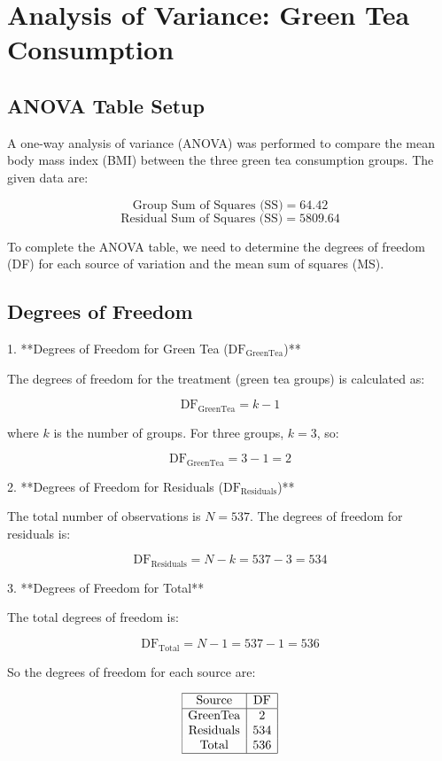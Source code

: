 \documentclass{article}
\begin{document}
\section*{Analysis of Variance: Green Tea Consumption}


\subsection*{ANOVA Table Setup}

A one-way analysis of variance (ANOVA) was performed to compare the mean body mass index (BMI) between the three green tea consumption groups. The given data are:

\[
\text{Group Sum of Squares (SS)} = 64.42
\]
\[
\text{Residual Sum of Squares (SS)} = 5809.64
\]

To complete the ANOVA table, we need to determine the degrees of freedom (DF) for each source of variation and the mean sum of squares (MS). 

\subsection*{Degrees of Freedom}

1. **Degrees of Freedom for Green Tea (\(\text{DF}_{\text{GreenTea}}\))**

   The degrees of freedom for the treatment (green tea groups) is calculated as:

   \[
   \text{DF}_{\text{GreenTea}} = k - 1
   \]

   where \( k \) is the number of groups. For three groups, \( k = 3 \), so:

   \[
   \text{DF}_{\text{GreenTea}} = 3 - 1 = 2
   \]

2. **Degrees of Freedom for Residuals (\(\text{DF}_{\text{Residuals}}\))**

   The total number of observations is \( N = 537 \). The degrees of freedom for residuals is:

   \[
   \text{DF}_{\text{Residuals}} = N - k = 537 - 3 = 534
   \]

3. **Degrees of Freedom for Total**

   The total degrees of freedom is:

   \[
   \text{DF}_{\text{Total}} = N - 1 = 537 - 1 = 536
   \]

   So the degrees of freedom for each source are:

   \[
   \begin{array}{|c|c|}
   \hline
   \text{Source} & \text{DF} \\
   \hline
   \text{GreenTea} & 2 \\
   \text{Residuals} & 534 \\
   \text{Total} & 536 \\
   \hline
   \end{array}
   \]
\end{document}

